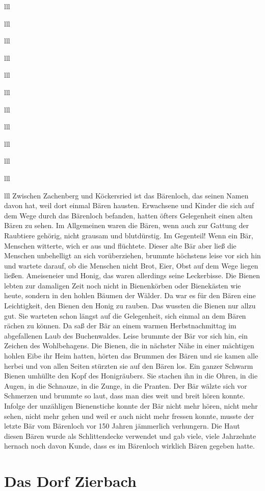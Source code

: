 \documentclass[12pt,a4pager]{book}
\begin{document}
\begin{tabuluar}{lll}
\begin{tabuluar}{lll}
\begin{tabuluar}{lll}
\begin{tabuluar}{lll}
\begin{tabuluar}{lll}
\begin{tabuluar}{lll}
\begin{tabuluar}{lll}
\begin{tabuluar}{lll}
\begin{tabuluar}{lll}
\begin{tabuluar}{lll}
\begin{tabuluar}{lll}
\begin{tabuluar}{lll}
Zwischen Zachenberg und Köckersried ist das Bärenloch, das seinen Namen davon
hat, weil dort einmal Bären hausten. Erwachsene und Kinder die sich auf dem Wege
durch das Bärenloch befanden, hatten öfters Gelegenheit einen alten Bären zu
sehen. Im Allgemeinen waren die Bären, wenn auch zur Gattung der Raubtiere
gehörig, nicht grausam und blutdürstig. Im Gegenteil! Wenn ein Bär, Menschen
witterte, wich er aus und flüchtete. Dieser alte Bär aber ließ die Menschen
unbehelligt an sich vorüberziehen, brummte höchstens leise vor sich hin und
wartete darauf, ob die Menschen nicht Brot, Eier, Obst auf dem Wege liegen
ließen. Ameiseneier und Honig, das waren allerdings seine Leckerbisse. Die
Bienen lebten zur damaligen Zeit noch nicht in Bienenkörben oder Bienekästen wie
heute, sondern in den hohlen Bäumen der Wälder. Da war es für den Bären eine
Leichtigkeit, den Bienen den Honig zu rauben. Das wussten die Bienen nur allzu
gut. Sie warteten schon längst auf die Gelegenheit, sich einmal an dem Bären
rächen zu können. Da saß der Bär an einem warmen Herbstnachmittag im
abgefallenen Laub des Buchenwaldes. Leise brummte der Bär vor sich hin, ein
Zeichen des Wohlbehagens. Die Bienen, die in nächster Nähe in einer mächtigen
hohlen Eibe ihr Heim hatten, hörten das Brummen des Bären und sie kamen alle
herbei und von allen Seiten stürzten sie auf den Bären los. Ein ganzer Schwarm
Bienen umhüllte den Kopf des Honigräubers. Sie stachen ihn in die Ohren, in die
Augen, in die Schnauze, in die Zunge, in die Pranten. Der Bär wälzte sich vor
Schmerzen und brummte so laut, dass man dies weit und breit hören konnte.
Infolge der unzähligen Bienenstiche konnte der Bär nicht mehr hören, nicht mehr
sehen, nicht mehr gehen und weil er auch nicht mehr fressen konnte, musste der
letzte Bär vom Bärenloch vor 150 Jahren jämmerlich verhungern. Die Haut diesen
Bären wurde als Schlittendecke verwendet und gab viele, viele Jahrzehnte hernach
noch davon Kunde, dass es im Bärenloch wirklich Bären gegeben hatte.

\section{Das Dorf Zierbach}


\end{tabuluar}
\end{tabuluar}
\end{tabuluar}
\end{tabuluar}
\end{tabuluar}
\end{tabuluar}
\end{tabuluar}
\end{tabuluar}
\end{tabuluar}
\end{tabuluar}
\end{tabuluar}
\end{tabuluar}
\end{document}
